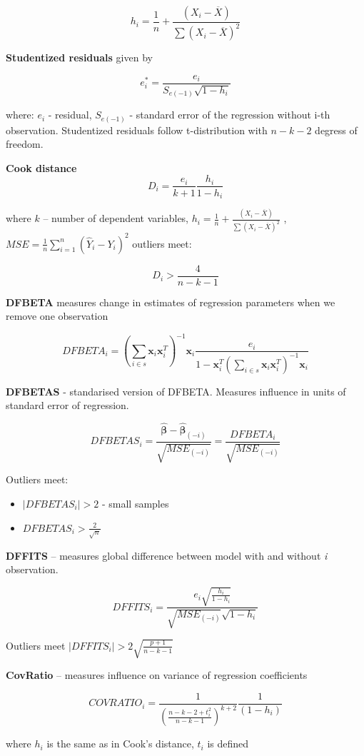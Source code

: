 \documentclass[]{book}
\providecommand{\tightlist}{%
  \setlength{\itemsep}{0pt}\setlength{\parskip}{0pt}}
\begin{document}
\[
h_i = \frac{1}{n} + \frac{(X_i - \overline{X})}{\sum(X_i - \overline{X})^2}
\]

\textbf{Studentized residuals} given by

\[
e_{i}^{*}=\frac{e_i}{S_{e(-1)}\sqrt{1-h_i}}
\]

where: \(e_i\) - residual, \(S_{e(-1)}\) - standard error of the
regression without i-th observation. Studentized residuals follow
t-distribution with \(n-k-2\) degress of freedom.

\textbf{Cook distance} \[ 
D_i=\frac{e_i}{k+1}\frac{h_i}{1-h_i}
\]

where \(k\) -- number of dependent variables,
\(h_i = \frac{1}{n} + \frac{(X_i - \overline{X})}{\sum(X_i - \overline{X})^2}\)
, \(MSE=\frac{1}{n}\sum_{i=1}^n(\hat{Y}_i-Y_i)^2\) outliers meet:

\[
D_i>\frac{4}{n-k-1}
\]

\textbf{DFBETA} measures change in estimates of regression parameters
when we remove one observation

\[
DFBETA_i=(\sum_{i \in s} \mathbf{x}_i\mathbf{x}_i^T)^{-1}\mathbf{x}_i\frac{e_i}{1-\mathbf{x}_i^T(\sum_{i \in s} \mathbf{x}_i\mathbf{x}_i^T)^{-1}\mathbf{x}_i}
\]

\textbf{DFBETAS} - standarised version of DFBETA. Measures influence in
units of standard error of regression.

\[ 
DFBETAS_i=\frac{\hat{\mathbf{\beta}}-\hat{\mathbf{\beta}}_{(-i)}}{\sqrt{MSE_{(-i)}}}=\frac{DFBETA_i}{\sqrt{MSE_{(-i)}}}
\]

Outliers meet:

\begin{itemize}
\tightlist
\item
  \(|DFBETAS_i|>2\) - small samples
\item
  \(DFBETAS_i>\frac{2}{\sqrt{n}}\)
\end{itemize}

\textbf{DFFITS} -- measures global difference between model with and
without \emph{i} observation.

\[
DFFITS_i=\frac{e_i\sqrt{\frac{h_i}{1-h_i}}}{\sqrt{MSE_{(-i)}}\sqrt{{1-h_i}}}
\]

Outliers meet \(|DFFITS_i| > 2\sqrt{\frac{p+1}{n-k-1}}\)

\textbf{CovRatio} -- measures influence on variance of regression
coefficients

\[
COVRATIO_i=\frac{1}{(\frac{n-k-2+t_i^2}{n-k-1})^{k+2}}\frac{1}{(1-h_i)}
\]

where \(h_i\) is the same as in Cook's distance, \(t_i\) is defined
\end{document}
